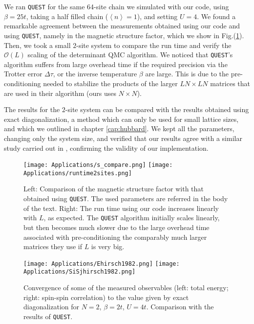 We ran \texttt{QUEST} for the same 64-site chain we simulated with our code, using $\beta = 25 t$, taking a half filled chain ($\left\langle n \right\rangle = 1$), and setting $U = 4$.
We found a remarkable agreement between the measurements obtained using our code and using \texttt{QUEST}, namely in the magnetic structure factor, which we show in Fig.(\ref{fig:quest_time}).
Then, we took a small $2$-site system to compare the run time and verify the $\mathcal{O}(L)$ scaling of the determinant \ac{QMC} algorithm.
We noticed that \texttt{QUEST}'s algorithm suffers from large overhead time if the required precision via the Trotter error $\Delta \tau$, or the inverse temperature $\beta$ are large. 
This is due to the pre-conditioning needed to stabilize the products of the larger $L N \times L N$ matrices that are used in their algorithm (ours uses $N \times N$).

The results for the $2$-site system can be compared with the results obtained using exact diagonalization, a method which can only be used for small lattice sizes, and which we outlined in chapter \ref{cap:hubbard}.
We kept all the parameters, changing only the system size, and verified that our results agree with a similar study carried out in \cite{hirsch_discrete_1983}, confirming the validity of our implementation.

\begin{figure}[H]
\hspace{0.1cm}
\texttt{[image: Applications/s\_compare.png]}
\hspace{0.5cm}
\texttt{[image: Applications/runtime2sites.png]}
\caption[Comparison of the magnetic structure factor with that obtained using \texttt{QUEST}. Run time comparison.]{Left: Comparison of the magnetic structure factor with that obtained using \texttt{QUEST}.
The used parameters are referred in the body of the text.
Right: The run time using our code increases linearly with $L$, as expected.
The \texttt{QUEST} algorithm initially scales linearly, but then becomes much slower due to the large overhead time associated with pre-conditioning the comparably much larger matrices they use if $L$ is very big.\label{fig:quest_time}}
\end{figure}
\begin{figure}[H]\label{fig:hirsch1982}
\texttt{[image: Applications/Ehirsch1982.png]}
\hspace{0.3cm}
\texttt{[image: Applications/SiSjhirsch1982.png]}
\caption[Convergence of some of the measured observables to the value given by exact diagonalization for $N=2$, $\beta = 2 t$, $U = 4 t$.
Comparison with the results of \texttt{QUEST}.]{Convergence of some of the measured observables (left: total energy; right: spin-spin correlation) to the value given by exact diagonalization for $N=2$, $\beta = 2 t$, $U = 4 t$.
Comparison with the results of \texttt{QUEST}.}
\end{figure}
